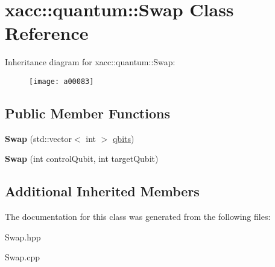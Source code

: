 \hypertarget{a00083}{}\section{xacc\+:\+:quantum\+:\+:Swap Class Reference}
\label{a00083}
Inheritance diagram for xacc\+:\+:quantum\+:\+:Swap\+:\begin{figure}[H]
\begin{center}
\leavevmode
\texttt{[image: a00083]}
\end{center}
\end{figure}
\subsection*{Public Member Functions}
\begin{DoxyCompactItemize}
\item 
{\bfseries Swap} (std\+::vector$<$ int $>$ \hyperlink{a00042_a2a56be6c2519ea65df4d06f4abae1393}{qbits})\hypertarget{a00083_a5c35a23a635f235a5615be65e769c121}{}\label{a00083_a5c35a23a635f235a5615be65e769c121}

\item 
{\bfseries Swap} (int control\+Qubit, int target\+Qubit)\hypertarget{a00083_ac19efe303b798e14441a2c235b5ba7f3}{}\label{a00083_ac19efe303b798e14441a2c235b5ba7f3}

\end{DoxyCompactItemize}
\subsection*{Additional Inherited Members}


The documentation for this class was generated from the following files\+:\begin{DoxyCompactItemize}
\item 
Swap.\+hpp\item 
Swap.\+cpp\end{DoxyCompactItemize}

